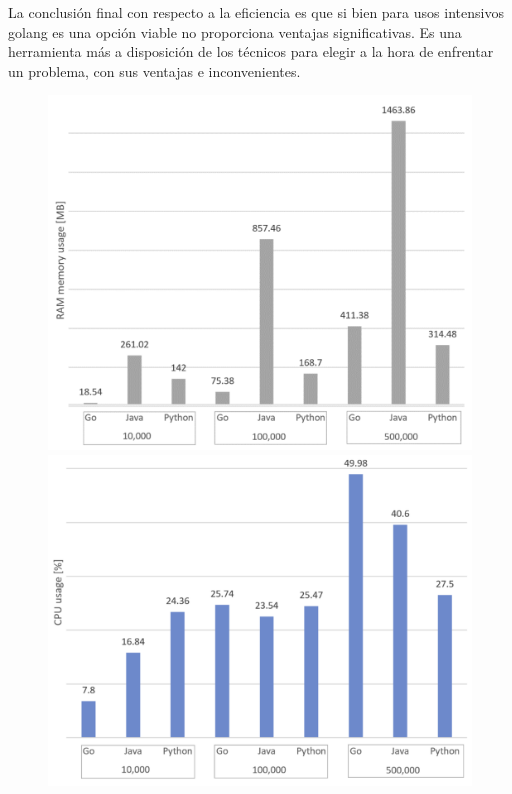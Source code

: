La conclusión final con respecto a la eficiencia es que si bien para usos intensivos golang es una opción viable no proporciona ventajas significativas.
Es una herramienta más a disposición de los técnicos para elegir a la hora de enfrentar un problema, con sus ventajas e inconvenientes.

\begin{figure}[H]
	\centering
	\includegraphics[height=0.3\textheight]{./part/Proyecto_ejecutivo/memoria_constructiva/golang/img/memory_usage}
	\includegraphics[height=0.3\textheight]{./part/Proyecto_ejecutivo/memoria_constructiva/golang/img/cpuUsage}

\end{figure}
